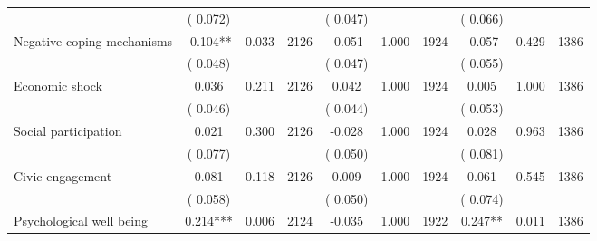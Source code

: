 \begin{tabular}{l*{9}{c}}
                               &        (       0.072) & &                                                                 &       (       0.047) & &                                                          &       (       0.066) & &  \\ 
 Negative coping mechanisms                 &             -0.104**          &        0.033 & 2126          &             -0.051 &        1.000 & 1924                   &       -0.057 &        0.429 & 1386                 \\ 
                               &        (       0.048) & &                                                                 &       (       0.047) & &                                                          &       (       0.055) & &  \\ 
 Economic shock                 &              0.036          &        0.211 & 2126          &              0.042 &        1.000 & 1924                   &        0.005 &        1.000 & 1386                 \\ 
                               &        (       0.046) & &                                                                 &       (       0.044) & &                                                          &       (       0.053) & &   \\ 
 Social participation                 &              0.021          &        0.300 & 2126          &             -0.028 &        1.000 & 1924                   &        0.028 &        0.963 & 1386                 \\ 
                               &        (       0.077) & &                                                                 &       (       0.050) & &                                                          &       (       0.081) & &   \\ 
 Civic engagement                 &              0.081          &        0.118 & 2126          &              0.009 &        1.000 & 1924                   &        0.061 &        0.545 & 1386                 \\ 
                               &        (       0.058) & &                                                                 &       (       0.050) & &                                                          &       (       0.074) & &  \\ 
 Psychological well being                &              0.214***        &        0.006 & 2124        &             -0.035 &        1.000 & 1922               &        0.247** &        0.011 & 1386       \\ 

\end{tabular}
